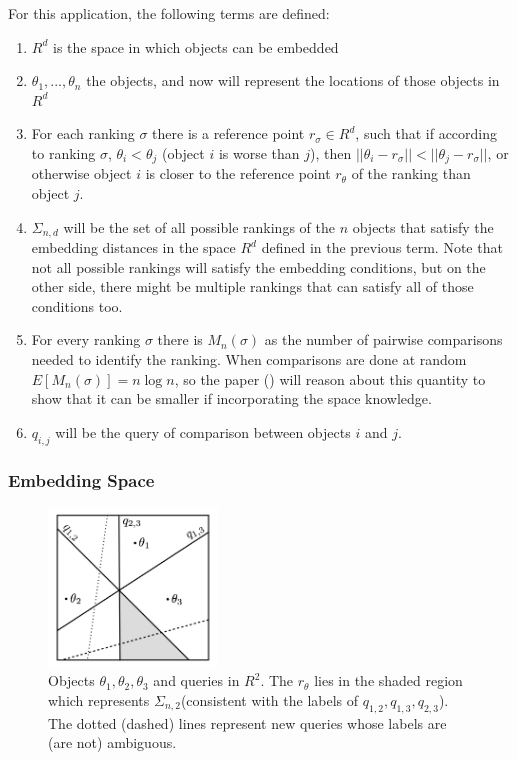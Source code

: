 \documentclass[
  letterpaper,
  DIV=11,
  numbers=noendperiod,
  oneside]{scrreprt}
\theoremstyle{remark}
\begin{document}
For this application, the following terms are defined:

\begin{enumerate}
\def\labelenumi{\arabic{enumi}.}
\item
  \(R^d\) is the space in which objects can be embedded
\item
  \(\theta_1,...,\theta_n\) the objects, and now will represent the
  locations of those objects in \(R^d\)
\item
  For each ranking \(\sigma\) there is a reference point
  \(r_{\sigma} \in R^d\), such that if according to ranking \(\sigma\),
  \(\theta_{i} < \theta_{j}\) (object \(i\) is worse than \(j\)), then
  \(||\theta_i - r_{\sigma}|| < ||\theta_j - r_{\sigma}||\), or
  otherwise object \(i\) is closer to the reference point \(r_\theta\)
  of the ranking than object \(j\).
\item
  \(\Sigma_{n,d}\) will be the set of all possible rankings of the \(n\)
  objects that satisfy the embedding distances in the space \(R^d\)
  defined in the previous term. Note that not all possible rankings will
  satisfy the embedding conditions, but on the other side, there might
  be multiple rankings that can satisfy all of those conditions too.
\item
  For every ranking \(\sigma\) there is \(M_n(\sigma)\) as the number of
  pairwise comparisons needed to identify the ranking. When comparisons
  are done at random \(E[M_n(\sigma)] = n\log n\), so the paper
  () will reason about this
  quantity to show that it can be smaller if incorporating the space
  knowledge.
\item
  \(q_{i,j}\) will be the query of comparison between objects \(i\) and
  \(j\).
\end{enumerate}

\subsubsection{Embedding Space}\label{embedding-space}

\begin{figure}

{\centering \includegraphics[width=0.4\textwidth,height=\textheight]{Figures/SPACE.png}

}

\caption{Objects \(\theta_1, \theta_2, \theta_3\) and queries in
\(R^2\). The \(r_\theta\) lies in the shaded region which represents
\(\Sigma_{n,2}\)(consistent with the labels of
\(q_{1,2}, q_{1,3}, q_{2,3}\)). The dotted (dashed) lines represent new
queries whose labels are (are not) ambiguous.}

\end{figure}%
\end{document}
